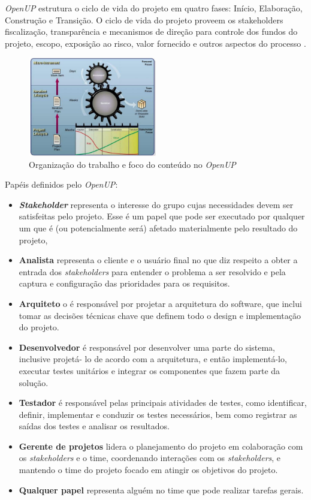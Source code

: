 \documentclass{acm_proc_article-sp}
\begin{document}
\textit{OpenUP} estrutura o ciclo de vida do projeto em quatro fases: Início, Elaboração, Construção e Transição. O ciclo de vida do projeto proveem os stakeholders fiscalização, transparência e mecanismos de direção para controle dos fundos do projeto, escopo, exposição ao risco, valor fornecido e outros aspectos do processo \cite{openUP:agil}.

\begin{figure}[h]
\centering %
\includegraphics[width=0.5\textwidth]{organizacaoTrabOpenUP.JPG} %
\caption{Organização do trabalho e foco do conteúdo no \textit{OpenUP} \cite{openUP:agil}}
\end{figure}

Papéis definidos pelo \textit{OpenUP}:

\begin{itemize}
\item \textbf{\textit{Stakeholder}} representa o interesse do grupo cujas necessidades devem ser satisfeitas
pelo projeto. Esse é um papel que pode ser executado por qualquer um que é (ou
potencialmente será) afetado materialmente pelo resultado do projeto,
\item \textbf{Analista}  representa o cliente e o usuário final no que diz respeito a obter a entrada
dos \textit{stakeholders} para entender o problema a ser resolvido e pela captura e
configuração das prioridades para os requisitos.
\item \textbf{Arquiteto} o é responsável por projetar a arquitetura do software, que inclui tomar as
decisões técnicas chave que definem todo o design e implementação do projeto.
\item \textbf{Desenvolvedor} é responsável por desenvolver uma parte do sistema, inclusive projetá-
lo de acordo com a arquitetura, e então implementá-lo, executar testes unitários e
integrar os componentes que fazem parte da solução.
\item \textbf{Testador} é responsável pelas principais atividades de testes, como identificar, definir,
implementar e conduzir os testes necessários, bem como registrar as saídas dos testes
e analisar os resultados.
\item \textbf{Gerente de projetos} lidera o planejamento do projeto em colaboração com os
\textit{stakeholders} e o time, coordenando interações com os \textit{stakeholders}, e mantendo o
time do projeto focado em atingir os objetivos do projeto.
\item \textbf{Qualquer papel} representa alguém no time que pode realizar tarefas gerais.
\end{itemize}
\end{document}

